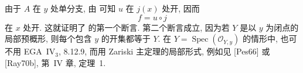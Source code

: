 由于 \(A\) 在 \(y\) 处单分支,
由 \textup{} 可知
\(u\) 在 \(j(x)\) 处开, 因而
\[
  f=u\circ j
\]
在 \(x\) 处开. 这就证明了
\textup{} 的第一个断言.
第二个断言成立, 因为若 \(Y\) 是以 \(y\) 为闭点的局部预概形,
则每个包含 \(y\) 的开集都等于 \(Y\).
在 \(Y=\operatorname{Spec}(\mathcal O_{Y,y})\) 的情形中,
也可不用 EGA~IV\(_3\), 8.12.9,
而用 Zariski 主定理的局部形式, 例如见 [Pes66] 或 [Ray70b], 第~IV 章, 定理~1.

